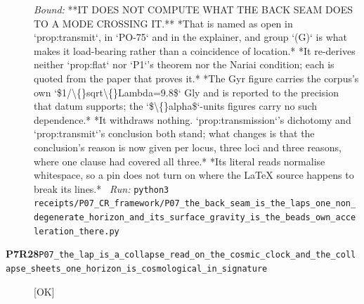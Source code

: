 \begin{description}
 \emph{Bound:}  **IT DOES NOT COMPUTE WHAT THE BACK SEAM DOES TO A MODE CROSSING IT.** *That is named as open in `prop:transmit`, in `PO-75` and in the explainer, and group `(G)` is what makes it load-bearing rather than a coincidence of location.*  *It re-derives neither `prop:flat` nor `P1`'s theorem nor the Nariai condition; each is quoted from the paper that proves it.*  *The Gyr figure carries the corpus's own `\$1/\textbackslash\{\}sqrt\textbackslash\{\}Lambda=9.8\$` Gly and is reported to the precision that datum supports; the `\$\textbackslash\{\}alpha\$`-units figures carry no such dependence.*  *It withdraws nothing. `prop:transmission`'s dichotomy and `prop:transmit`'s conclusion both stand; what changes is that the conclusion's reason is now given per locus, three loci and three reasons, where one clause had covered all three.*  *Its literal reads normalise whitespace, so a pin does not turn on where the LaTeX source happens to break its lines.*
\ \emph{Run:} \texttt{python3 receipts/P07\_CR\_framework/P07\_the\_back\_seam\_is\_the\_laps\_one\_non\_degenerate\_horizon\_and\_its\_surface\_gravity\_is\_the\_beads\_own\_acceleration\_there.py}
\item[\rcptlabel{P07_the_lap_is_a_collapse_read_on_the_cosmic_clock_and_the_collapse_sheets_one_horizon_is_cosmological_in_signature}{P7R28}\textbf{P7R28}\quad\texttt{P07\_the\_lap\_is\_a\_collapse\_read\_on\_the\_cosmic\_clock\_and\_the\_collapse\_sheets\_one\_horizon\_is\_cosmological\_in\_signature}]\hfill\textsf{[OK]}\\

\end{description}
